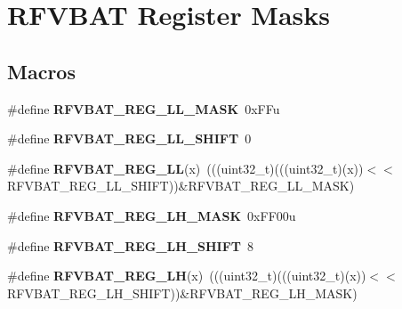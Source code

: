 \hypertarget{group__RFVBAT__Register__Masks}{}\section{R\+F\+V\+B\+AT Register Masks}
\label{group__RFVBAT__Register__Masks}
\subsection*{Macros}
\begin{DoxyCompactItemize}
\item 
\#define {\bfseries R\+F\+V\+B\+A\+T\+\_\+\+R\+E\+G\+\_\+\+L\+L\+\_\+\+M\+A\+SK}~0x\+F\+Fu\hypertarget{group__RFVBAT__Register__Masks_gac055aaeebf0ff5200e7b3703d6a6ed73}{}\label{group__RFVBAT__Register__Masks_gac055aaeebf0ff5200e7b3703d6a6ed73}

\item 
\#define {\bfseries R\+F\+V\+B\+A\+T\+\_\+\+R\+E\+G\+\_\+\+L\+L\+\_\+\+S\+H\+I\+FT}~0\hypertarget{group__RFVBAT__Register__Masks_ga77fdef5edef0e9e20236761366ed3fbb}{}\label{group__RFVBAT__Register__Masks_ga77fdef5edef0e9e20236761366ed3fbb}

\item 
\#define {\bfseries R\+F\+V\+B\+A\+T\+\_\+\+R\+E\+G\+\_\+\+LL}(x)~(((uint32\+\_\+t)(((uint32\+\_\+t)(x))$<$$<$R\+F\+V\+B\+A\+T\+\_\+\+R\+E\+G\+\_\+\+L\+L\+\_\+\+S\+H\+I\+FT))\&R\+F\+V\+B\+A\+T\+\_\+\+R\+E\+G\+\_\+\+L\+L\+\_\+\+M\+A\+SK)\hypertarget{group__RFVBAT__Register__Masks_ga0e8446d5980a8863f4d5f0be690e78a3}{}\label{group__RFVBAT__Register__Masks_ga0e8446d5980a8863f4d5f0be690e78a3}

\item 
\#define {\bfseries R\+F\+V\+B\+A\+T\+\_\+\+R\+E\+G\+\_\+\+L\+H\+\_\+\+M\+A\+SK}~0x\+F\+F00u\hypertarget{group__RFVBAT__Register__Masks_gaac2f9a56be08c02d917e25d2160bb25d}{}\label{group__RFVBAT__Register__Masks_gaac2f9a56be08c02d917e25d2160bb25d}

\item 
\#define {\bfseries R\+F\+V\+B\+A\+T\+\_\+\+R\+E\+G\+\_\+\+L\+H\+\_\+\+S\+H\+I\+FT}~8\hypertarget{group__RFVBAT__Register__Masks_ga274af8b911ddd78c1ce6df899ad83cbd}{}\label{group__RFVBAT__Register__Masks_ga274af8b911ddd78c1ce6df899ad83cbd}

\item 
\#define {\bfseries R\+F\+V\+B\+A\+T\+\_\+\+R\+E\+G\+\_\+\+LH}(x)~(((uint32\+\_\+t)(((uint32\+\_\+t)(x))$<$$<$R\+F\+V\+B\+A\+T\+\_\+\+R\+E\+G\+\_\+\+L\+H\+\_\+\+S\+H\+I\+FT))\&R\+F\+V\+B\+A\+T\+\_\+\+R\+E\+G\+\_\+\+L\+H\+\_\+\+M\+A\+SK)\hypertarget{group__RFVBAT__Register__Masks_ga016bf338b7050742a030ffe81d9be9a4}{}\label{group__RFVBAT__Register__Masks_ga016bf338b7050742a030ffe81d9be9a4}


\end{DoxyCompactItemize}
